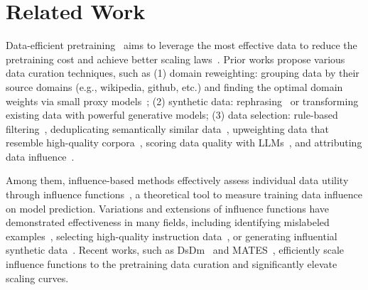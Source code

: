 \section{Related Work}


Data-efficient pretraining~\cite{albalak2024dataselectionsurvey} aims to leverage the most effective data to reduce the pretraining cost and achieve better scaling laws~\cite{kaplan2020scaling,Chinchilla}. Prior works propose various data curation techniques, such as (1) domain reweighting: grouping data by their source domains (e.g., wikipedia, github, etc.) and finding the optimal domain weights via small proxy models~\cite{xie2024doremi,fan2023doge,liu2024regmix}; (2) synthetic data:
rephrasing~\cite{maini2024rephrasing,abdin2024phi} or transforming~\cite{yang2024synthetic,zhou2024programming} existing data with powerful generative models; (3) data selection: rule-based filtering~\cite{t5,penedo2024refinedweb}, deduplicating semantically similar data~\cite{abbas2023semdedup,tirumala2024d4}, upweighting data that resemble high-quality corpora~\cite{xie2023data,li2024datacomp}, scoring data quality with LLMs~\cite{wettig2024qurating,penedo2024fineweb}, and attributing data influence~\cite{engstrom2024dsdm,yu2024mates,zhang2024quad}.

Among them, influence-based methods effectively assess individual data utility through influence functions~\cite{weisberg1982residuals,koh2017understanding}, a theoretical tool to measure training data influence on model prediction.
Variations and extensions of influence functions have demonstrated effectiveness in many fields, including identifying mislabeled examples~\cite{pruthi2020estimating,yeh2022first}, selecting high-quality instruction data~\cite{xia2024less}, or generating influential synthetic data~\cite{li2024montessori}. Recent works, such as DsDm~\cite{engstrom2024dsdm} and MATES~\cite{yu2024mates}, efficiently scale influence functions to the pretraining data curation and significantly elevate scaling curves.


